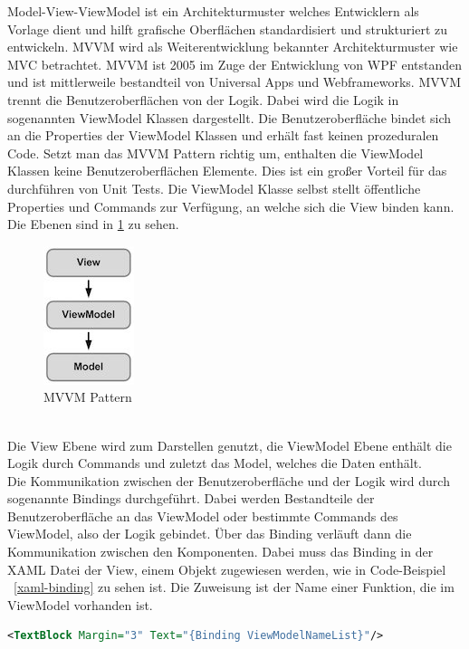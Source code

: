 Model-View-ViewModel ist ein Architekturmuster welches Entwicklern als Vorlage dient und hilft grafische Oberflächen standardisiert und strukturiert zu entwickeln. MVVM wird als Weiterentwicklung bekannter Architekturmuster wie MVC betrachtet. MVVM ist 2005 im Zuge der Entwicklung von WPF entstanden und ist mittlerweile bestandteil von Universal Apps und Webframeworks. MVVM trennt die Benutzeroberflächen von der Logik. Dabei wird die Logik in sogenannten ViewModel Klassen dargestellt. Die Benutzeroberfläche bindet sich an die Properties der ViewModel Klassen und erhält fast keinen prozeduralen Code. Setzt man das MVVM Pattern richtig um, enthalten die ViewModel Klassen keine Benutzeroberflächen Elemente. Dies ist ein großer Vorteil für das durchführen von Unit Tests. Die ViewModel Klasse selbst stellt öffentliche Properties und Commands zur Verfügung, an welche sich die View binden kann. Die Ebenen sind in \ref{pic:mvvm-pattern} zu sehen.
\begin{figure}[ht]
    \centering
    \includegraphics{3Technologien/Bilder/mvvmpattern}
    \caption{MVVM Pattern}
    \label{pic:mvvm-pattern}
\end{figure}
\linebreak
\\Die View Ebene wird zum Darstellen genutzt, die ViewModel Ebene enthält die Logik durch Commands und zuletzt das Model, welches die Daten enthält. 
\\Die Kommunikation zwischen der Benutzeroberfläche und der Logik wird durch sogenannte Bindings durchgeführt. Dabei werden Bestandteile der Benutzeroberfläche an das ViewModel oder bestimmte Commands des ViewModel, also der Logik gebindet. Über das Binding verläuft dann die Kommunikation zwischen den Komponenten. Dabei muss das Binding in der XAML Datei der View, einem Objekt zugewiesen werden, wie in Code-Beispiel ~\ref{xaml-binding} zu sehen ist. Die Zuweisung ist der Name einer Funktion, die im ViewModel vorhanden ist.
\\
\begin{lstlisting}[language=XML,
    frame=single,           % Ein Rahmen um den Code
    framexleftmargin=15pt,  % Rahmen link von den Zahlen
    style=algoBericht,
    label={xaml-binding},
    captionpos=b,           % Caption unter den Code setzen
caption={Binding in XAML}]
    <TextBlock Margin="3" Text="{Binding ViewModelNameList}"/>
\end{lstlisting}
